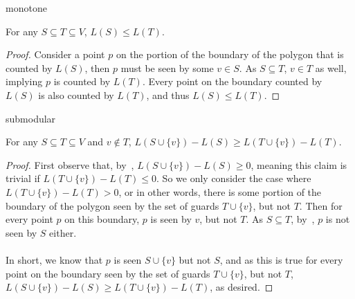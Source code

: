 

monotone

\begin{observation}\label{obs:monotone}
    For any $S\subseteq T\subseteq V$, $L(S)\leq L(T)$.
\end{observation}

\begin{proof}
    Consider a point $p$ on the portion of the boundary of the polygon that is counted by $L(S)$, then $p$ must be seen by some $v\in S$. As $S\subseteq T$, $v\in T$ as well, implying $p$ is counted by $L(T)$. Every point on the boundary counted by $L(S)$ is also counted by $L(T)$, and thus $L(S)\leq L(T)$. 
\end{proof}

submodular
\begin{claim}\label{clm:submodular}
    For any $S\subseteq T\subseteq V$ and $v\notin T$, $L(S\cup\{v\})-L(S)\geq L(T\cup\{v\})-L(T)$.
\end{claim}

\begin{proof}
    First observe that, by~, $L(S\cup\{v\})-L(S)\geq 0$, meaning this claim is trivial if $L(T\cup\{v\})-L(T)\leq 0$. So we only consider the case where $L(T\cup\{v\})-L(T)>0$, or in other words, there is some portion of the boundary of the polygon seen by the set of guards $T\cup\{v\}$, but not $T$. Then for every point $p$ on this boundary, $p$ is seen by $v$, but not $T$. As $S\subseteq T$, by~, $p$ is not seen by $S$ either. \\\\
    In short, we know that $p$ is seen $S\cup\{v\}$ but not $S$, and as this is true for every point on the boundary seen by the set of guards $T\cup\{v\}$, but not $T$, $L(S\cup\{v\})-L(S)\geq L(T\cup\{v\})-L(T)$, as desired.
\end{proof}